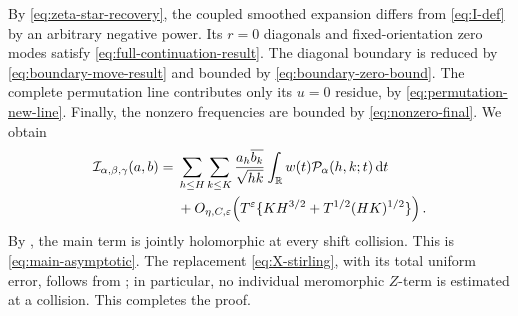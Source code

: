 By \eqref{eq:zeta-star-recovery}, the coupled smoothed expansion differs from
\eqref{eq:I-def} by an arbitrary negative power.  Its $r=0$ diagonals and
fixed-orientation zero modes satisfy
\eqref{eq:full-continuation-result}.  The diagonal boundary is reduced by
\eqref{eq:boundary-move-result} and bounded by
\eqref{eq:boundary-zero-bound}.  The complete permutation line contributes
only its $u=0$ residue, by \eqref{eq:permutation-new-line}.  Finally, the
nonzero frequencies are bounded by \eqref{eq:nonzero-final}.  We obtain
\begin{align*}
 \mathcal I_{\alpha,\beta,\gamma}(a,b)
 ={}&\sum_{h\leq H}\sum_{k\leq K}
 \frac{a_h\overline{b_k}}{\sqrt{hk}}
 \int_{\mathbb R}w(t)\mathcal P_\alpha(h,k;t)\,\mathrm d t\\
 &+O_{\eta,C,\varepsilon}\!\left(
 T^\varepsilon\{KH^{3/2}+T^{1/2}(HK)^{1/2}\}\right).
\end{align*}
 By , the main term is jointly holomorphic at every
 shift collision.  This is \eqref{eq:main-asymptotic}.  The replacement
 \eqref{eq:X-stirling}, with its total uniform error, follows from
 ; in particular, no individual
 meromorphic $Z$-term is estimated at a collision.  This completes the proof.
